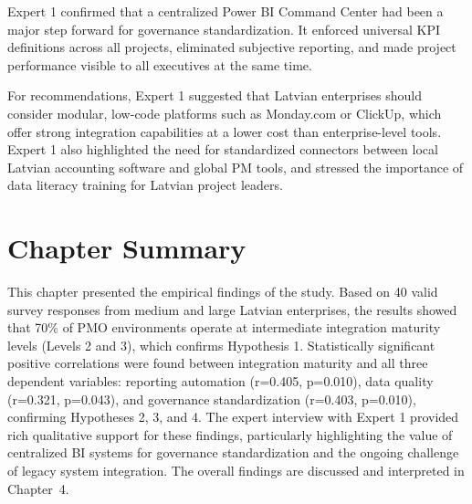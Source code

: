 Expert 1 confirmed that a centralized Power BI Command Center had
been a major step forward for governance standardization. It enforced
universal KPI definitions across all projects, eliminated subjective
reporting, and made project performance visible to all executives
at the same time.

For recommendations, Expert 1 suggested that Latvian enterprises
should consider modular, low-code platforms such as Monday.com or
ClickUp, which offer strong integration capabilities at a lower cost
than enterprise-level tools. Expert 1 also highlighted the need for
standardized connectors between local Latvian accounting software
and global PM tools, and stressed the importance of data literacy
training for Latvian project leaders.

\section{Chapter Summary}
\label{sec:chap3summary}

This chapter presented the empirical findings of the study. Based
on 40 valid survey responses from medium and large Latvian
enterprises, the results showed that 70\% of PMO environments
operate at intermediate integration maturity levels (Levels 2 and 3),
which confirms Hypothesis 1. Statistically significant positive
correlations were found between integration maturity and all three
dependent variables: reporting automation (r=0.405, p=0.010),
data quality (r=0.321, p=0.043), and governance standardization
(r=0.403, p=0.010), confirming Hypotheses 2, 3, and 4. The expert
interview with Expert 1 provided rich qualitative support for
these findings, particularly highlighting the value of centralized
BI systems for governance standardization and the ongoing challenge
of legacy system integration. The overall findings are discussed
and interpreted in Chapter~4.
